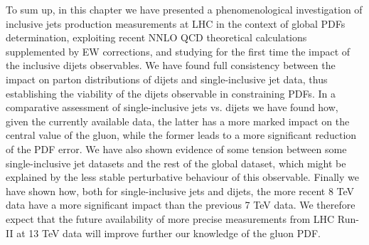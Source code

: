 %
To sum up, in this chapter we have presented a phenomenological investigation of inclusive jets
production measurements at LHC in the context of global PDFs determination, exploiting recent NNLO QCD 
theoretical calculations supplemented by EW corrections,
and studying for the first time the impact of the inclusive dijets observables.
We have found full consistency between the impact on parton distributions of dijets and single-inclusive jet data,
thus establishing the viability of the dijets observable in constraining PDFs.
In a comparative assessment of single-inclusive jets vs. dijets we have found how, given the currently available data,
the latter has a more marked impact on the central value of the gluon, 
while the former leads to a more significant reduction of the PDF error. We have also shown evidence of some tension
between some single-inclusive jet datasets and the rest of the global dataset, which might be explained by the less stable
perturbative behaviour of this observable.
Finally we have shown how, both for single-inclusive jets and dijets, the more recent 8 TeV data have a more significant
impact than the previous 7 TeV data. We therefore expect that the future availability of more precise measurements
from LHC Run-II at 13 TeV data will improve further our knowledge of the gluon PDF.   